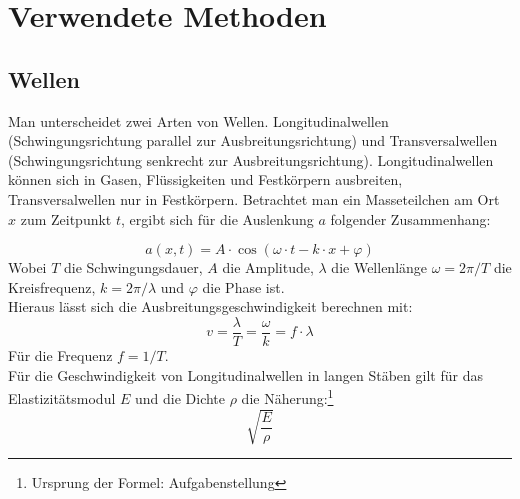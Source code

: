 \section{Verwendete Methoden}
\subsection{Wellen}
Man unterscheidet zwei Arten von Wellen. Longitudinalwellen (Schwingungsrichtung parallel zur Ausbreitungsrichtung) und Transversalwellen (Schwingungsrichtung senkrecht zur Ausbreitungsrichtung). Longitudinalwellen können sich in Gasen, Flüssigkeiten und Festkörpern ausbreiten, Transversalwellen nur in Festkörpern. Betrachtet man ein Masseteilchen am Ort $x$ zum Zeitpunkt $t$, ergibt sich für die Auslenkung $a$ folgender Zusammenhang:

\begin{equation}
a(x, t) = A \cdot \cos (\omega \cdot t - k \cdot x + \varphi)
\end{equation}
Wobei $T$ die Schwingungsdauer, $A$ die Amplitude, $\lambda$ die Wellenlänge $\omega = 2\pi /T$ die Kreisfrequenz, $k = 2\pi /\lambda$ und $\varphi$ die Phase ist.\\
Hieraus lässt sich die Ausbreitungsgeschwindigkeit berechnen mit:
\begin{equation}
v = \frac{\lambda}{T} = \frac{\omega}{k} = f \cdot \lambda
\end{equation}
Für die Frequenz $f = 1/T$.\\
Für die Geschwindigkeit von Longitudinalwellen in langen Stäben gilt für das Elastizitätsmodul $E$ und die Dichte $\rho$ die Näherung:\footnote{Ursprung der Formel: Aufgabenstellung}
\begin{equation}
\sqrt{\frac{E}{\rho}}
\end{equation}